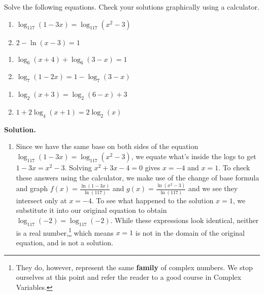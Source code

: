\begin{ex}  \label{LogEqnsEx1} Solve the following equations.  Check your solutions graphically using a calculator.

\begin{multicols}{2}
\begin{enumerate}

\item  $\log_{117}(1-3x) = \log_{117}\left(x^2-3\right)$

\item  $2 - \ln(x-3) = 1$

\setcounter{HW}{\value{enumi}}
\end{enumerate}
\end{multicols}

\begin{multicols}{2}
\begin{enumerate}
\setcounter{enumi}{\value{HW}}

\item  $\log_{6}(x+4) + \log_{6}(3-x) = 1$

\item  $\log_{7}(1-2x) = 1 - \log_{7}(3-x)$
\setcounter{HW}{\value{enumi}}
\end{enumerate}
\end{multicols}

\begin{multicols}{2}
\begin{enumerate}
\setcounter{enumi}{\value{HW}}

\item  $\log_{2}(x+3) = \log_{2}(6-x)+3$

\item  $1 + 2 \log_{4}(x+1) = 2 \log_{2}(x)$

\end{enumerate}
\end{multicols}

{\bf Solution.}

\begin{enumerate}

\item  Since we have the same base on both sides of the equation $\log_{117}(1-3x) = \log_{117}\left(x^2-3\right)$, we equate what's inside the logs to get $1-3x = x^2-3$.  Solving $x^2+3x-4 = 0$ gives $x=-4$ and $x=1$. To check these answers using the calculator, we make use of the change of base formula and graph $f(x) = \frac{\ln(1-3x)}{\ln(117)}$ and $g(x) = \frac{\ln\left(x^2-3\right)}{\ln(117)}$ and we see they intersect only at $x=-4$.  To see what happened to the solution $x=1$, we substitute it into our original equation to obtain  $\log_{117}(-2) =  \log_{117}(-2)$.  While these expressions look identical, neither is a real number,\footnote{They do, however, represent the same \textbf{family} of complex numbers.  We stop ourselves at this point and refer the reader to a good course in Complex Variables.} which means $x=1$ is not in the domain of the original equation, and is not a solution.    


\end{enumerate}
\end{ex}
